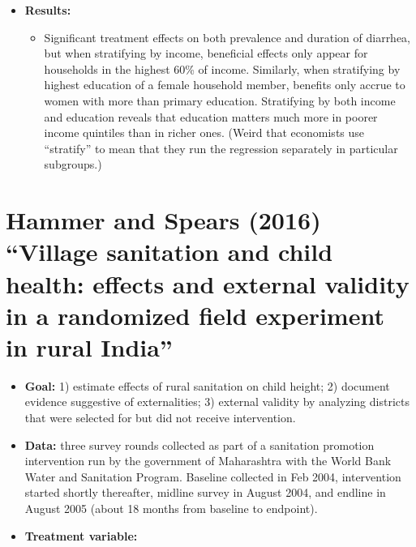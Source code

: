 \documentclass[10pt,a4paper]{article}
\begin{document}
\begin{itemize}
	\item \textbf{Results:}
		\begin{itemize}
			\item Significant treatment effects on both prevalence and duration of diarrhea, but when stratifying by income, beneficial effects only appear for households in the highest 60\% of income. Similarly, when stratifying by highest education of a female household member, benefits only accrue to women with more than primary education. Stratifying by both income and education reveals that education matters much more in poorer income quintiles than in richer ones. (Weird that economists use ``stratify'' to mean that they run the regression separately in particular subgroups.)
		\end{itemize}
\end{itemize}

\section*{Hammer and Spears (2016) ``Village sanitation and child health: effects and external validity in a randomized field experiment in rural India''}
\begin{itemize}
	\item \textbf{Goal:} 1) estimate effects of rural sanitation on child height; 2) document evidence suggestive of externalities; 3) external validity by analyzing districts that were selected for but did not receive intervention.
	\item \textbf{Data:} three survey rounds collected as part of a sanitation promotion intervention run by the government of Maharashtra with the World Bank Water and Sanitation Program. Baseline collected in Feb 2004, intervention started shortly thereafter, midline survey in August 2004, and endline in August 2005 (about 18 months from baseline to endpoint).
	\item \textbf{Treatment variable:} 
\end{itemize}

\end{document}
